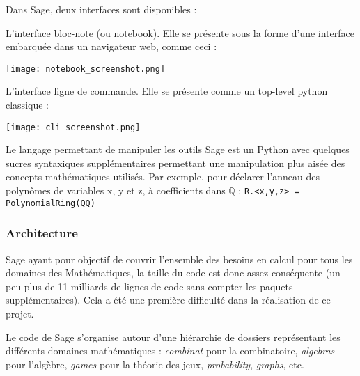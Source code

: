 \documentclass[12pt]{article}
\begin{document}
Dans Sage, deux interfaces sont disponibles :
\vspace{3mm}

\begin{itemize}
\noindent\begin{minipage}{\linewidth}
\item L'interface bloc-note (ou notebook). Elle se présente sous la forme
 d'une interface embarquée dans un navigateur web, comme ceci :
\vspace{3mm}
\begin{center}
\texttt{[image: notebook\_screenshot.png]}
\end{center}
\end{minipage}
\noindent\begin{minipage}{\linewidth}
\item L'interface ligne de commande. Elle se présente comme un top-level
  python classique :
\vspace{3mm}
\begin{center}
\texttt{[image: cli\_screenshot.png]}
\end{center}
\end{minipage}
\end{itemize}


\vspace{3mm}
Le langage permettant de manipuler les outils Sage est un Python avec quelques sucres
syntaxiques supplémentaires permettant une manipulation plus aisée des
concepts mathématiques utilisés. Par exemple, pour déclarer l'anneau des
polynômes de variables x, y et z, à coefficients dans $\mathbb{Q}$ :
\verb|R.<x,y,z> = PolynomialRing(QQ)|


\subsubsection{Architecture}
Sage ayant pour objectif de couvrir l'ensemble des besoins en calcul pour
tous les domaines des Mathématiques, la taille du code est donc assez
conséquente (un peu plus de 11 milliards de lignes de code sans compter les
paquets supplémentaires). Cela a été une première difficulté dans la
réalisation de ce projet.


Le code de Sage s'organise autour d'une hiérarchie de dossiers représentant
les différents domaines mathématiques : \emph{combinat} pour la combinatoire,
\emph{algebras} pour l'algèbre, \emph{games} pour la théorie des jeux,
\emph{probability}, \emph{graphs}, etc.
\end{document}
